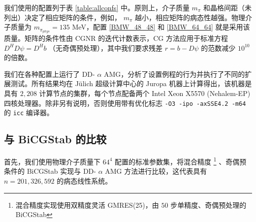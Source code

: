 \documentclass{siamltex}
\begin{document}
我们使用的配置列于表    \ref{table:allconfs}    中。原则上，介子质量    $m_\pi$    和晶格间距（未列出）决定了相应矩阵的条件，例如，   $m_\pi$    越小，相应矩阵的病态性越强。物理介子质量为
$m_{\pi_{\mathit{phys}}} = 135$    MeV，配置
\ref{BMW_48_48}    和    \ref{BMW_64_64}    就是采用该质量。矩阵的条件性由 CGNR 的迭代计数表示，CG 方法应用于标准方程    $D^HD\psi = D^Hb$   （无奇偶预处理），其中我们要求残差    $r = b - D\psi$    的范数减少
$10^{10}$    的倍数。

我们在各种配置上运行了 DD-    $\alpha$    AMG，分析了设置例程的行为并执行了不同的扩展测试。所有结果均在 J\"{u}lich 超级计算中心的 Juropa 机器上计算得出，该机器是具有    $2,\!208$    计算节点的集群，每个节点配备两个 Intel Xeon X5570 (Nehalem-EP) 四核处理器。除非另有说明，否则使用带有优化标志    \texttt{-O3 -ipo -axSSE4.2 -m64}    的    \texttt{icc}    编译器。
\subsection{与 BiCGStab 的比较  }       \label{ss:solver_comparison}    首先，我们使用物理介子质量下    $64^4$    配置的标准参数集，将混合精度    \footnote{混合精度实现使用双精度灵活 GMRES(25)，由    $50$    步单精度、奇偶预处理的 BiCGStab  }   、奇偶预条件的 BiCGStab 实现与 DD-    $\alpha$    AMG 方法进行比较，这代表具有    $n=201,\!326,\!592$    的病态线性系统。

\begin{table}[ht]
  \centering{}
  \caption{BiCGStab 与 \  DD-    $\alpha$    AMG 的默认参数（表~    \ref{table:allparms}   ）在配置~    \ref{BMW_64_64}   （表~    \ref{table:allconfs}   ）、   $8,\!192$    核心、   $(*):$    粗网格迭代在细网格上的所有迭代中相加。  }
  \label{table:comp_64_4}
\end{table}
\end{document}

